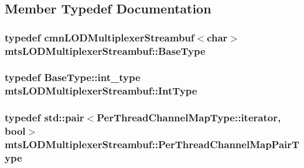 \subsection{Member Typedef Documentation}
\hypertarget{classmts_l_o_d_multiplexer_streambuf_a61c8f5498c012321fdc38e97a43393a2}{
\subsubsection[{Base\-Type}]{\setlength{\rightskip}{0pt plus 5cm}typedef {\bf cmn\-L\-O\-D\-Multiplexer\-Streambuf}$<$char$>$ {\bf mts\-L\-O\-D\-Multiplexer\-Streambuf\-::\-Base\-Type}}}\label{classmts_l_o_d_multiplexer_streambuf_a61c8f5498c012321fdc38e97a43393a2}
\hypertarget{classmts_l_o_d_multiplexer_streambuf_a21823525be07ef7a8c1c3b053f3fedf2}{
\subsubsection[{Int\-Type}]{\setlength{\rightskip}{0pt plus 5cm}typedef {\bf Base\-Type\-::int\-\_\-type} {\bf mts\-L\-O\-D\-Multiplexer\-Streambuf\-::\-Int\-Type}}}\label{classmts_l_o_d_multiplexer_streambuf_a21823525be07ef7a8c1c3b053f3fedf2}
\hypertarget{classmts_l_o_d_multiplexer_streambuf_aa6778f2331bcb1be3e4817612b97f42a}{
\subsubsection[{Per\-Thread\-Channel\-Map\-Pair\-Type}]{\setlength{\rightskip}{0pt plus 5cm}typedef std\-::pair$<$Per\-Thread\-Channel\-Map\-Type\-::iterator, bool$>$ {\bf mts\-L\-O\-D\-Multiplexer\-Streambuf\-::\-Per\-Thread\-Channel\-Map\-Pair\-Type}\hspace{0.3cm}{\ttfamily [protected]}}}\label{classmts_l_o_d_multiplexer_streambuf_aa6778f2331bcb1be3e4817612b97f42a}
